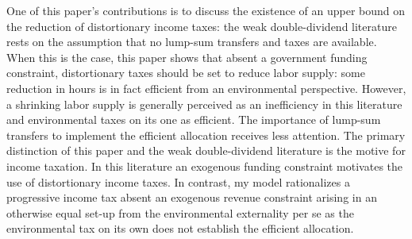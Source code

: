 One of this paper's contributions is to discuss the existence of an upper bound on the reduction of distortionary income taxes: the weak double-dividend literature rests on the assumption that no lump-sum transfers and taxes are available. When this is the case, this paper shows that absent a government funding constraint, distortionary taxes should be set to reduce labor supply: some reduction in hours is in fact efficient from an environmental perspective. However, a shrinking labor supply is generally perceived as an inefficiency in this literature and environmental taxes on its one as efficient. The importance of lump-sum transfers to implement the efficient allocation receives less attention.  %
 The primary distinction of this paper and the weak double-dividend literature is the motive for income taxation. In this literature an exogenous funding constraint motivates the use of distortionary income taxes. In contrast, my model rationalizes a progressive income tax absent an exogenous revenue constraint arising in an otherwise equal set-up from the environmental externality per se as the environmental tax on its own does not establish the efficient allocation. 






